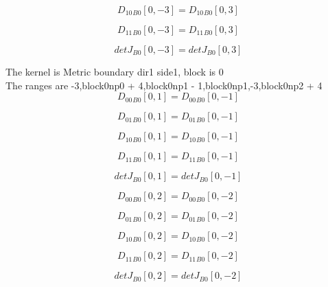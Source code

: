 \documentclass{article}
\begin{document}
\begin{dmath}{D_{10}{_{B0}}}[{0,-3}] = {D_{10}{_{B0}}}[{0,3}]\end{dmath}

\begin{dmath}{D_{11}{_{B0}}}[{0,-3}] = {D_{11}{_{B0}}}[{0,3}]\end{dmath}

\begin{dmath}{detJ{_{B0}}}[{0,-3}] = {detJ{_{B0}}}[{0,3}]\end{dmath}

\noindent The kernel is Metric boundary dir1 side1, block is 0\\\noindent The ranges are -3,block0np0 + 4,block0np1 - 1,block0np1,-3,block0np2 + 4\\\begin{dmath}{D_{00}{_{B0}}}[{0,1}] = {D_{00}{_{B0}}}[{0,-1}]\end{dmath}

\begin{dmath}{D_{01}{_{B0}}}[{0,1}] = {D_{01}{_{B0}}}[{0,-1}]\end{dmath}

\begin{dmath}{D_{10}{_{B0}}}[{0,1}] = {D_{10}{_{B0}}}[{0,-1}]\end{dmath}

\begin{dmath}{D_{11}{_{B0}}}[{0,1}] = {D_{11}{_{B0}}}[{0,-1}]\end{dmath}

\begin{dmath}{detJ{_{B0}}}[{0,1}] = {detJ{_{B0}}}[{0,-1}]\end{dmath}

\begin{dmath}{D_{00}{_{B0}}}[{0,2}] = {D_{00}{_{B0}}}[{0,-2}]\end{dmath}

\begin{dmath}{D_{01}{_{B0}}}[{0,2}] = {D_{01}{_{B0}}}[{0,-2}]\end{dmath}

\begin{dmath}{D_{10}{_{B0}}}[{0,2}] = {D_{10}{_{B0}}}[{0,-2}]\end{dmath}

\begin{dmath}{D_{11}{_{B0}}}[{0,2}] = {D_{11}{_{B0}}}[{0,-2}]\end{dmath}

\begin{dmath}{detJ{_{B0}}}[{0,2}] = {detJ{_{B0}}}[{0,-2}]\end{dmath}
\end{document}
